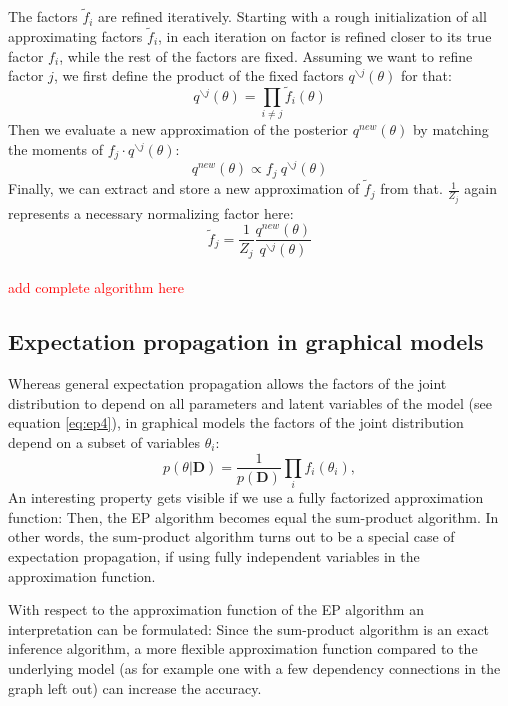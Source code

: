\documentclass{sigkdd}
\begin{document}
The factors $\tilde{f}_i$ are refined iteratively. Starting with a rough initialization of all approximating factors $\tilde{f}_i$, in each iteration on factor is refined closer to its true factor $f_i$, while the rest of the factors are fixed. Assuming we want to refine factor $j$, we first define the product of the fixed factors $q^{\backslash j}(\theta)$ for that:
\begin{equation}\label{eq:ep7}
q^{\backslash j}(\theta) = \prod_{i\ne j} \tilde{f}_i(\theta)
\end{equation}
Then we evaluate a new approximation of the posterior $q^{new}(\theta)$ by matching the moments of $f_j \cdot q^{\backslash j}(\theta)$:
\begin{equation}\label{eq:ep7.1}
q^{new}(\theta) \propto f_j ~ q^{\backslash j}(\theta)
\end{equation}
Finally, we can extract and store a new approximation of $\tilde{f}_j$ from that. $\frac{1}{Z_j}$ again represents a necessary normalizing factor here:
\begin{equation}\label{eq:ep8}
\tilde{f}_j = \frac{1}{Z_j} \frac{q^{new}(\theta)}{q^{\backslash j}(\theta)}
\end{equation}
\\ \textcolor{red}{add complete algorithm here}
\subsection{Expectation propagation in graphical models}
Whereas general expectation propagation allows the factors of the joint distribution to depend on all parameters and latent variables of the model (see equation \ref{eq:ep4}), in graphical models the factors of the joint distribution depend on a subset of variables $\theta_i$:
\begin{equation}\label{eq:ep9}
p(\theta|\mathbf{D}) = \frac{1}{p(\mathbf{D})} \prod_i f_i(\theta_i),
\end{equation}
An interesting property gets visible if we use a fully factorized approximation function: Then, the EP algorithm becomes equal the sum-product algorithm. In other words, the sum-product algorithm turns out to be a special case of expectation propagation, if using fully independent variables in the approximation function.

With respect to the approximation function of the EP algorithm an interpretation can be formulated: Since the sum-product algorithm is an exact inference algorithm, a more flexible approximation function compared to the underlying model (as for example one with a few dependency connections in the graph left out) can increase the accuracy.
\end{document}
